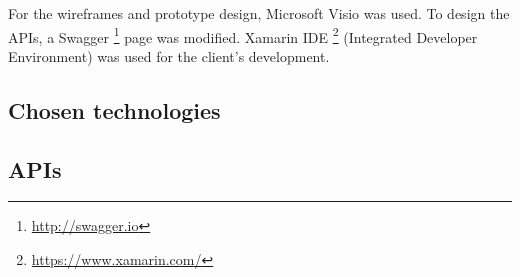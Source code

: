 For the wireframes and prototype design, Microsoft Visio was used. To design the APIs, a Swagger \footnote{\url{http://swagger.io}} page was modified. Xamarin IDE \footnote{\url{https://www.xamarin.com/}} (Integrated Developer Environment) was used for the client's development.

\subsection{Chosen technologies}



\subsection{APIs}

